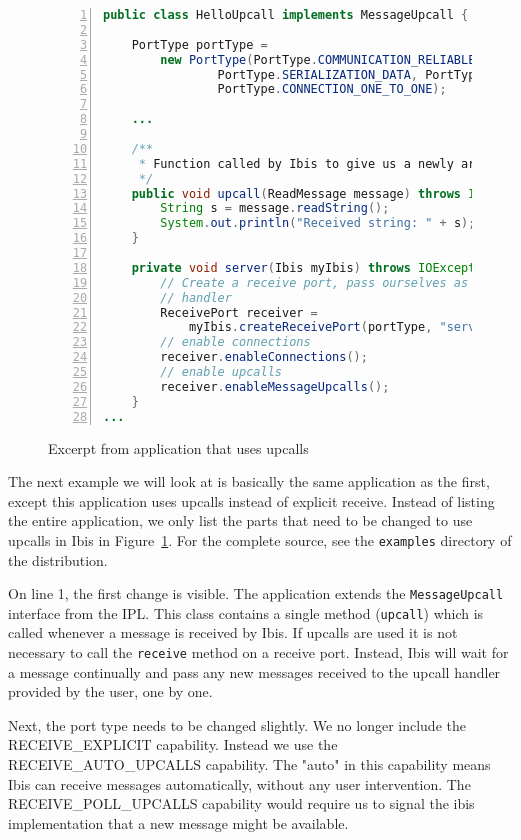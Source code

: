 \begin{figure}[ht]
\lstset{basicstyle=\footnotesize,breaklines=false}
\begin{lstlisting}[language=Java,numbers=left, numbersep=3pt]
public class HelloUpcall implements MessageUpcall {

    PortType portType =
        new PortType(PortType.COMMUNICATION_RELIABLE,
                PortType.SERIALIZATION_DATA, PortType.RECEIVE_AUTO_UPCALLS,
                PortType.CONNECTION_ONE_TO_ONE);

    ...

    /**
     * Function called by Ibis to give us a newly arrived message.
     */
    public void upcall(ReadMessage message) throws IOException {
        String s = message.readString();
        System.out.println("Received string: " + s);
    }

    private void server(Ibis myIbis) throws IOException {
        // Create a receive port, pass ourselves as the message upcall
        // handler
        ReceivePort receiver =
            myIbis.createReceivePort(portType, "server", this);
        // enable connections
        receiver.enableConnections();
        // enable upcalls
        receiver.enableMessageUpcalls();
    }
...
\end{lstlisting}
\caption{Excerpt from application that uses upcalls}
\label{hello_upcall_source}
\end{figure}

The next example we will look at is basically the same application as
the first, except this application uses upcalls instead of explicit
receive. Instead of listing the entire application, we only list the
parts that need to be changed to use upcalls in Ibis in
Figure~\ref{hello_upcall_source}. For the complete source, see the
\texttt{examples} directory of the distribution.

On line 1, the first change is visible. The application extends the
\texttt{MessageUpcall} interface from the IPL. This class contains a
single method (\texttt{upcall}) which is called whenever a message is
received by Ibis. If upcalls are used it is not necessary to call the
\texttt{receive} method on a receive port. Instead, Ibis will wait for a
message continually and pass any new messages received to the upcall
handler provided by the user, one by one.

Next, the port type needs to be changed slightly. We no longer include
the RECEIVE\_EXPLICIT capability. Instead we use the
RECEIVE\_AUTO\_UPCALLS capability. The "auto" in this capability means
Ibis can receive messages automatically, without any user intervention.
The RECEIVE\_POLL\_UPCALLS capability would require us to signal the
ibis implementation that a new message might be available.

